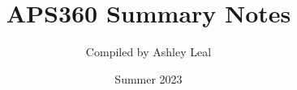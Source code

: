 \documentclass{book}
\begin{document}
\title{APS360 Summary Notes}
\author{Compiled by Ashley Leal}
\date{Summer 2023}

\let\cleardoublepage=\clearpage

\frontmatter %
\maketitle %

\tableofcontents %

\mainmatter %

\begin{comment}
\begin{definition}
    This is a definition box 
\end{definition}

\begin{theorem}
    This is a theorem box 
\end{theorem}

\begin{idea}
    This is an idea box 
\end{idea}

\begin{warning}
    This is a warning box
\end{warning}

\begin{example}
    This is an example box 
\end{example}
\end{comment}










\end{document}
